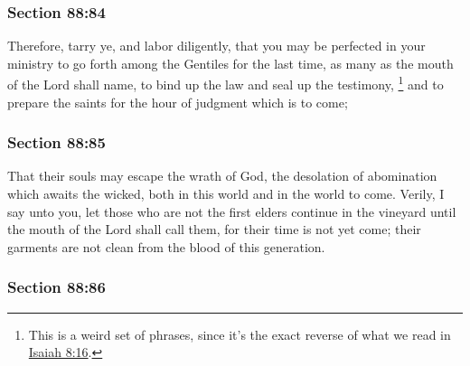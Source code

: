 	\subsubsection{Section 88:84} %
		\label{DC88-84}

		Therefore, tarry ye, and labor diligently, that you may be perfected in your ministry to go forth among the Gentiles for the last time, as many as the mouth of the Lord shall name, to bind up the law and seal up the testimony,%
			\footnote{%
				This is a weird set of phrases, since it's the exact reverse of what we read in \hyperref[ISAIAH-8-16]{Isaiah 8:16}.
				}
		and to prepare the saints for the hour of judgment which is to come;


	\subsubsection{Section 88:85} %
		\label{DC88-85}

		That their souls may escape the wrath of God, the desolation of abomination which awaits the wicked, both in this world and in the world to come. Verily, I say unto you, let those who are not the first elders continue in the vineyard until the mouth of the Lord shall call them, for their time is not yet come; their garments are not clean from the blood of this generation.


	\subsubsection{Section 88:86} %
		\label{DC88-86}

